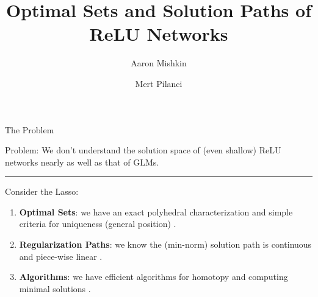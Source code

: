\documentclass[usenames,dvipsnames,mathserif,notheorems]{beamer}
\title{Optimal Sets and Solution Paths of ReLU Networks}
\author{Aaron Mishkin \and Mert Pilanci}
\institute{ICML 2023}
\date{}
\newcommand{\horizontalrule}{
	{
			\vspace{-0.5em}
			\center \rule{\textwidth}{0.1em}
			\vspace{-0.2em}
		}
}
\newcommand{\bad}[1]{\textcolor{bad}{#1}}
\newcommand{\good}[1]{\textcolor{good}{#1}}
\begin{document}
\maketitle

\begin{frame}{The Problem}

	{
		\large \bad{Problem}: We don't understand the solution space of
		(even shallow) ReLU networks nearly as well as that of \good{GLMs}.
	}

	\pause
	\vspace{0.5em}
	\horizontalrule
	\vspace{0.5em}

	{
		\large
		Consider the Lasso:
	}

	\pause
	\vspace{0.5em}

	\begin{enumerate}
		\item \textbf{Optimal Sets}: we have an exact \good{polyhedral
			      characterization} and simple criteria for \good{uniqueness}
		      (general position) \citep{tibshirani2013unique}.
		      \pause

		\item \textbf{Regularization Paths}: we know the (min-norm) solution
		      path is \good{continuous} and \good{piece-wise linear}
		      \citep{osborne2000new}.
		      \pause

		\item \textbf{Algorithms}: we have efficient algorithms for
		      \good{homotopy} \citep{efron2004least} and computing \good{minimal
			      solutions} \citep{tibshirani2013unique}.
	\end{enumerate}

\end{frame}
\end{document}
